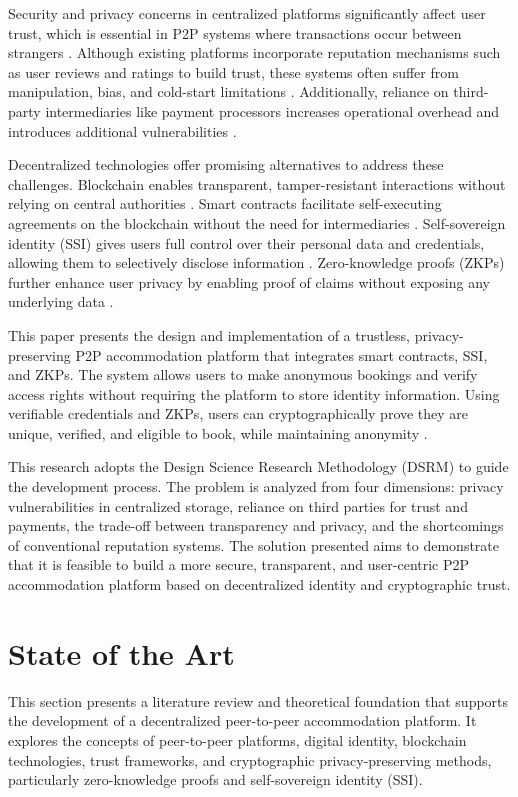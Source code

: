 \documentclass[conference]{IEEEtran}
\begin{document}
Security and privacy concerns in centralized platforms significantly affect user trust, which is essential in P2P systems where transactions occur between strangers \cite{mayer1995, oliveira2017, agag2019}. Although existing platforms incorporate reputation mechanisms such as user reviews and ratings to build trust, these systems often suffer from manipulation, bias, and cold-start limitations \cite{tussyadiah2018, zloteanu2021, huang2021}. Additionally, reliance on third-party intermediaries like payment processors increases operational overhead and introduces additional vulnerabilities \cite{hawlitschek2018, bhushan2021}.

Decentralized technologies offer promising alternatives to address these challenges. Blockchain enables transparent, tamper-resistant interactions without relying on central authorities \cite{nakamoto2008, wood2022}. Smart contracts facilitate self-executing agreements on the blockchain without the need for intermediaries \cite{buterin2014, bhushan2021}. Self-sovereign identity (SSI) gives users full control over their personal data and credentials, allowing them to selectively disclose information \cite{wang2019, raipurkar2023, mittal2025}. Zero-knowledge proofs (ZKPs) further enhance user privacy by enabling proof of claims without exposing any underlying data \cite{dieye2023, chen2022, moya2023}.

This paper presents the design and implementation of a trustless, privacy-preserving P2P accommodation platform that integrates smart contracts, SSI, and ZKPs. The system allows users to make anonymous bookings and verify access rights without requiring the platform to store identity information. Using verifiable credentials and ZKPs, users can cryptographically prove they are unique, verified, and eligible to book, while maintaining anonymity \cite{lux2020, sporny2022, reed2020}.

This research adopts the Design Science Research Methodology (DSRM) \cite{peffers2007, venable2017} to guide the development process. The problem is analyzed from four dimensions: privacy vulnerabilities in centralized storage, reliance on third parties for trust and payments, the trade-off between transparency and privacy, and the shortcomings of conventional reputation systems. The solution presented aims to demonstrate that it is feasible to build a more secure, transparent, and user-centric P2P accommodation platform based on decentralized identity and cryptographic trust.

\section{State of the Art}
\label{sec:state-of-the-art}
This section presents a literature review and theoretical foundation that supports the development of a decentralized peer-to-peer accommodation platform. It explores the concepts of peer-to-peer platforms, digital identity, blockchain technologies, trust frameworks, and cryptographic privacy-preserving methods, particularly zero-knowledge proofs and self-sovereign identity (SSI).
\end{document}

